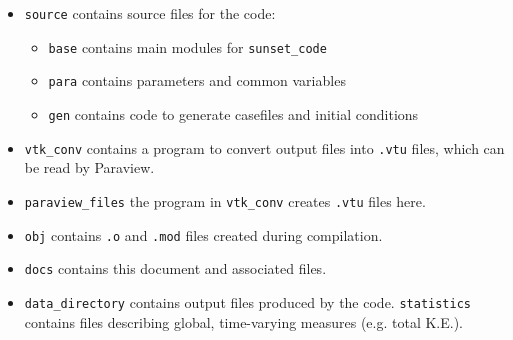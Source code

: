 \documentclass[notitlepage]{revtex4-1}
\begin{document}
\begin{itemize}
\item \verb|source| contains source files for the code:
\begin{itemize}
\item \verb|base| contains main modules for \verb|sunset_code|
\item \verb|para| contains parameters and common variables
\item \verb|gen| contains code to generate casefiles and initial conditions
\end{itemize}
\item \verb|vtk_conv| contains a program to convert output files into \verb|.vtu| files, which can be read by Paraview.
\item \verb|paraview_files| the program in \verb|vtk_conv| creates \verb|.vtu| files here.
\item \verb|obj| contains \verb|.o| and \verb|.mod| files created during compilation.
\item \verb|docs| contains this document and associated files.
\item \verb|data_directory| contains output files produced by the code. \verb|statistics| contains files describing global, time-varying measures (e.g. total K.E.).
\end{itemize}  



\end{document}
